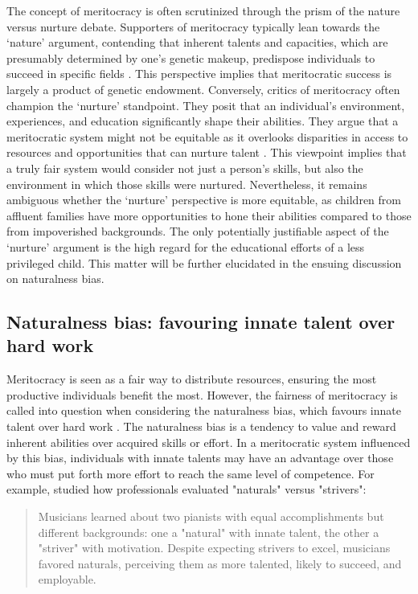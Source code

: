 The concept of meritocracy is often scrutinized through the prism of the nature versus nurture debate. Supporters of meritocracy typically lean towards the ‘nature’ argument, contending that inherent talents and capacities, which are presumably determined by one’s genetic makeup, predispose individuals to succeed in specific fields \citep{harris2021nature}. This perspective implies that meritocratic success is largely a product of genetic endowment. Conversely, critics of meritocracy often champion the ‘nurture’ standpoint. They posit that an individual’s environment, experiences, and education significantly shape their abilities. They argue that a meritocratic system might not be equitable as it overlooks disparities in access to resources and opportunities that can nurture talent \citep{montag2018nature}. This viewpoint implies that a truly fair system would consider not just a person’s skills, but also the environment in which those skills were nurtured. Nevertheless, it remains ambiguous whether the ‘nurture’ perspective is more equitable, as children from affluent families have more opportunities to hone their abilities compared to those from impoverished backgrounds. The only potentially justifiable aspect of the ‘nurture’ argument is the high regard for the educational efforts of a less privileged child. This matter will be further elucidated in the ensuing discussion on naturalness bias.
		
\subsection{Naturalness bias: favouring innate talent over hard work}

Meritocracy is seen as a fair way to distribute resources, ensuring the most productive individuals benefit the most. However, the fairness of meritocracy is called into question when considering the naturalness bias, which favours innate talent over hard work \citep{tsay2016privileging, tsay2011naturals}. The naturalness bias is a tendency to value and reward inherent abilities over acquired skills or effort. In a meritocratic system influenced by this bias, individuals with innate talents may have an advantage over those who must put forth more effort to reach the same level of competence. For example, \citet{tsay2011naturals} studied how professionals evaluated "naturals" versus "strivers":

\begin{quote}
Musicians learned about two pianists with equal accomplishments but different backgrounds: one a "natural" with innate talent, the other a "striver" with motivation. Despite expecting strivers to excel, musicians favored naturals, perceiving them as more talented, likely to succeed, and employable.
\end{quote}

